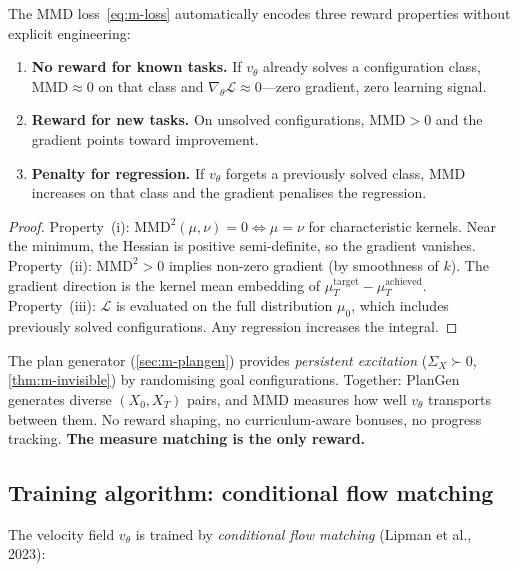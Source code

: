 \begin{proposition}
\label{prop:m-mmd-reward}
The MMD loss~\eqref{eq:m-loss} automatically encodes three
reward properties without explicit engineering:
\begin{enumerate}[label=(\roman*),nosep]
  \item \textbf{No reward for known tasks.}  If $v_\theta$ already
  solves a configuration class, $\mathrm{MMD} \approx 0$ on that
  class and $\nabla_\theta \mathcal{L} \approx 0$---zero gradient,
  zero learning signal.
  \item \textbf{Reward for new tasks.}  On unsolved configurations,
  $\mathrm{MMD} > 0$ and the gradient points toward improvement.
  \item \textbf{Penalty for regression.}  If $v_\theta$ forgets a
  previously solved class, $\mathrm{MMD}$ increases on that class
  and the gradient penalises the regression.
\end{enumerate}
\end{proposition}

\begin{proof}
Property~(i): $\mathrm{MMD}^2(\mu, \nu) = 0 \iff \mu = \nu$
for characteristic kernels.  Near the minimum, the Hessian is
positive semi-definite, so the gradient vanishes.
Property~(ii): $\mathrm{MMD}^2 > 0$ implies non-zero gradient
(by smoothness of $k$).  The gradient direction is the kernel
mean embedding of $\mu_T^{\mathrm{target}} -
\mu_T^{\mathrm{achieved}}$.
Property~(iii): $\mathcal{L}$ is evaluated on the full
distribution $\mu_0$, which includes previously solved
configurations.  Any regression increases the integral.
\end{proof}

The plan generator (\cref{sec:m-plangen}) provides
\emph{persistent excitation} ($\Sigma_X \succ 0$,
\cref{thm:m-invisible}) by randomising goal configurations.
Together: PlanGen generates diverse $(X_0, X_T)$ pairs, and
MMD measures how well $v_\theta$ transports between them.
No reward shaping, no curriculum-aware bonuses, no progress
tracking.  \textbf{The measure matching is the only reward.}

\subsection{Training algorithm: conditional flow matching}

The velocity field $v_\theta$ is trained by \emph{conditional
flow matching} (Lipman et al., 2023):

